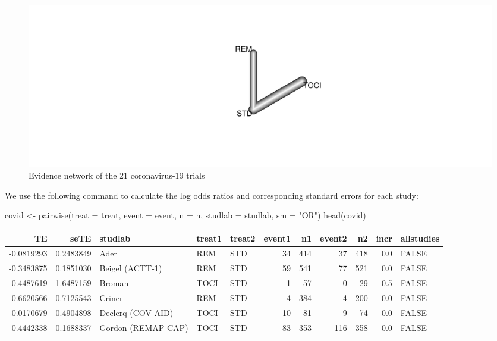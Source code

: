 \documentclass[
  letterpaper,
  DIV=11,
  numbers=noendperiod]{scrreprt}
\newenvironment{Shaded}{\begin{snugshade}}{\end{snugshade}}
\newcommand{\AttributeTok}[1]{\textcolor[rgb]{0.40,0.45,0.13}{#1}}
\newcommand{\FunctionTok}[1]{\textcolor[rgb]{0.28,0.35,0.67}{#1}}
\newcommand{\NormalTok}[1]{\textcolor[rgb]{0.00,0.23,0.31}{#1}}
\newcommand{\OtherTok}[1]{\textcolor[rgb]{0.00,0.23,0.31}{#1}}
\newcommand{\StringTok}[1]{\textcolor[rgb]{0.13,0.47,0.30}{#1}}
\begin{document}
\begin{figure}

{\centering \includegraphics{chapter_10_files/figure-pdf/unnamed-chunk-8-1.pdf}

}

\caption{Evidence network of the 21 coronavirus-19 trials}

\end{figure}

We use the following command to calculate the log odds ratios and
corresponding standard errors for each study:

\begin{Shaded}
\begin{Highlighting}[]
\NormalTok{covid }\OtherTok{\textless{}{-}} \FunctionTok{pairwise}\NormalTok{(}\AttributeTok{treat =}\NormalTok{ treat, }
                  \AttributeTok{event =}\NormalTok{ event, }
                  \AttributeTok{n =}\NormalTok{ n, }
                  \AttributeTok{studlab =}\NormalTok{ studlab, }
                  \AttributeTok{sm =} \StringTok{"OR"}\NormalTok{)}
\FunctionTok{head}\NormalTok{(covid)}
\end{Highlighting}
\end{Shaded}

\begin{tabular}{r|r|l|l|l|r|r|r|r|r|l}
\hline
TE & seTE & studlab & treat1 & treat2 & event1 & n1 & event2 & n2 & incr & allstudies\\
\hline
-0.0819293 & 0.2483849 & Ader & REM & STD & 34 & 414 & 37 & 418 & 0.0 & FALSE\\
\hline
-0.3483875 & 0.1851030 & Beigel (ACTT-1) & REM & STD & 59 & 541 & 77 & 521 & 0.0 & FALSE\\
\hline
0.4487619 & 1.6487159 & Broman & TOCI & STD & 1 & 57 & 0 & 29 & 0.5 & FALSE\\
\hline
-0.6620566 & 0.7125543 & Criner & REM & STD & 4 & 384 & 4 & 200 & 0.0 & FALSE\\
\hline
0.0170679 & 0.4904898 & Declerq (COV-AID) & TOCI & STD & 10 & 81 & 9 & 74 & 0.0 & FALSE\\
\hline
-0.4442338 & 0.1688337 & Gordon (REMAP-CAP) & TOCI & STD & 83 & 353 & 116 & 358 & 0.0 & FALSE\\
\hline
\end{tabular}
\end{document}
